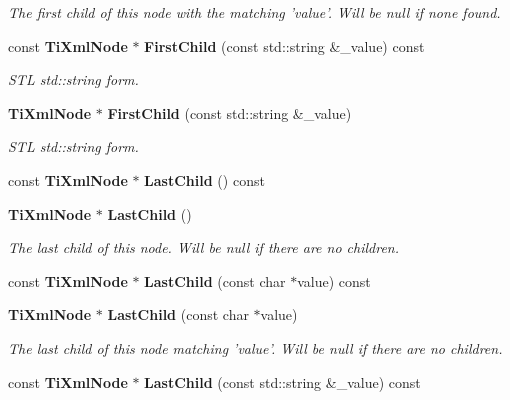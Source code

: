 \begin{CompactItemize}
\begin{CompactList}\small\item\em The first child of this node with the matching 'value'. Will be null if none found. \item\end{CompactList}\item 
const {\bf Ti\-Xml\-Node} $\ast$ {\bf First\-Child} (const std::string \&\_\-value) const\label{classTiXmlNode_TiXmlUnknowna18}

\begin{CompactList}\small\item\em STL std::string form. \item\end{CompactList}\item 
{\bf Ti\-Xml\-Node} $\ast$ {\bf First\-Child} (const std::string \&\_\-value)\label{classTiXmlNode_TiXmlUnknowna19}

\begin{CompactList}\small\item\em STL std::string form. \item\end{CompactList}\item 
const {\bf Ti\-Xml\-Node} $\ast$ {\bf Last\-Child} () const\label{classTiXmlNode_TiXmlUnknowna20}

\item 
{\bf Ti\-Xml\-Node} $\ast$ {\bf Last\-Child} ()\label{classTiXmlNode_TiXmlUnknowna21}

\begin{CompactList}\small\item\em The last child of this node. Will be null if there are no children. \item\end{CompactList}\item 
const {\bf Ti\-Xml\-Node} $\ast$ {\bf Last\-Child} (const char $\ast$value) const\label{classTiXmlNode_TiXmlUnknowna22}

\item 
{\bf Ti\-Xml\-Node} $\ast$ {\bf Last\-Child} (const char $\ast$value)\label{classTiXmlNode_TiXmlUnknowna23}

\begin{CompactList}\small\item\em The last child of this node matching 'value'. Will be null if there are no children. \item\end{CompactList}\item 
const {\bf Ti\-Xml\-Node} $\ast$ {\bf Last\-Child} (const std::string \&\_\-value) const\label{classTiXmlNode_TiXmlUnknowna24}


\end{CompactItemize}
